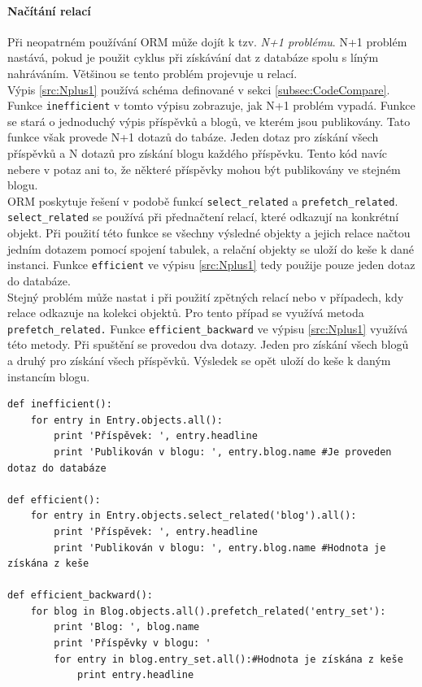 \documentclass[ing,male,java,dept456]{diploma}						%
\begin{document}
\paragraph{Načítání relací} 
\label{par:N+1}
Při neopatrném používání ORM může dojít k tzv. \textit{N+1 problému}. N+1 problém nastává, pokud je použit cyklus při získávání dat z databáze spolu s líným nahráváním. Většinou se tento problém projevuje u relací. \\
Výpis \ref{src:Nplus1} používá schéma definované v sekci \ref{subsec:CodeCompare}. Funkce \lstinline[style=custompython]|inefficient| v tomto výpisu zobrazuje, jak N+1 problém vypadá. Funkce se stará o jednoduchý výpis příspěvků a blogů, ve kterém jsou publikovány. Tato funkce však provede N+1 dotazů do tabáze. Jeden dotaz pro získání všech příspěvků a N dotazů pro získání blogu každého příspěvku. Tento kód navíc nebere v potaz ani to, že některé příspěvky mohou být publikovány ve stejném blogu. \\
ORM poskytuje řešení v podobě funkcí \lstinline[style=custompython]|select_related| a \lstinline[style=custompython]|prefetch_related|. \\ 
\lstinline[style=custompython]|select_related| se používá při přednačtení relací, které odkazují na konkrétní objekt. Při použití této funkce se všechny výsledné objekty a jejich relace načtou jedním dotazem pomocí spojení tabulek, a relační objekty se uloží do keše k dané instanci. Funkce \lstinline[style=custompython]|efficient| ve výpisu \ref{src:Nplus1} tedy použije pouze jeden dotaz do databáze. \\
Stejný problém může nastat i při použití zpětných relací nebo v případech, kdy relace odkazuje na kolekci objektů. Pro tento případ se využívá metoda \lstinline[style=custompython]|prefetch_related.| Funkce \lstinline[style=custompython]|efficient_backward| ve výpisu \ref{src:Nplus1} využívá této metody. Při spuštění se provedou dva dotazy. Jeden pro získání všech blogů a druhý pro získání všech příspěvků. Výsledek se opět uloží do keše k daným instancím blogu. 

\begin{lstlisting}[style=custompython, label=src:Nplus1, caption={N+1 problém a jeho řešení v Django ORM}]
def inefficient():
	for entry in Entry.objects.all():
		print 'Příspěvek: ', entry.headline
		print 'Publikován v blogu: ', entry.blog.name #Je proveden dotaz do databáze
		
def efficient():
	for entry in Entry.objects.select_related('blog').all():
		print 'Příspěvek: ', entry.headline
		print 'Publikován v blogu: ', entry.blog.name #Hodnota je získána z keše
		
def efficient_backward():
	for blog in Blog.objects.all().prefetch_related('entry_set'):
		print 'Blog: ', blog.name
		print 'Příspěvky v blogu: '
		for entry in blog.entry_set.all():#Hodnota je získána z keše
			print entry.headline
\end{lstlisting}
\end{document}
